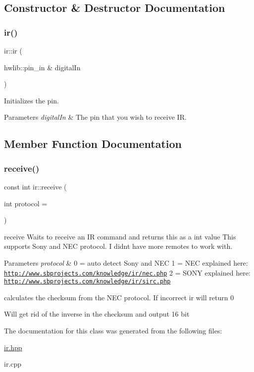\subsection{Constructor \& Destructor Documentation}
\mbox{\label{classir_a991bbdc6f99f2346cde9eb4c502e4eab}} 
\subsubsection{\texorpdfstring{ir()}{ir()}}
{\footnotesize\ttfamily ir\+::ir (\begin{DoxyParamCaption}\item[{hwlib\+::pin\+\_\+in \&}]{digital\+In }\end{DoxyParamCaption})}



Initializes the pin. 


\begin{DoxyParams}{Parameters}
{\em digital\+In} & The pin that you wish to receive IR. \\
\hline
\end{DoxyParams}


\subsection{Member Function Documentation}
\mbox{\label{classir_a89c6de406934c73ed5e4a4c122799bc3}} 
\subsubsection{\texorpdfstring{receive()}{receive()}}
{\footnotesize\ttfamily const int ir\+::receive (\begin{DoxyParamCaption}\item[{int}]{protocol = {} }\end{DoxyParamCaption})}



receive Waits to receive an IR command and returns this as a int value This supports Sony and N\+EC protocol. I didn\textquotesingle{}t have more remotes to work with. 


\begin{DoxyParams}{Parameters}
{\em protocol} & 0 = auto detect Sony and N\+EC 1 = N\+EC explained here\+: \href{http://www.sbprojects.com/knowledge/ir/nec.php}{\tt http\+://www.\+sbprojects.\+com/knowledge/ir/nec.\+php} 2 = S\+O\+NY explained here\+: \href{http://www.sbprojects.com/knowledge/ir/sirc.php}{\tt http\+://www.\+sbprojects.\+com/knowledge/ir/sirc.\+php} \\
\hline
\end{DoxyParams}
calculates the checksum from the N\+EC protocol. If incorrect ir will return 0

Will get rid of the inverse in the checksum and output 16 bit 

The documentation for this class was generated from the following files\+:\begin{DoxyCompactItemize}
\item 
\hyperlink{ir_8hpp}{ir.\+hpp}\item 
ir.\+cpp\end{DoxyCompactItemize}
